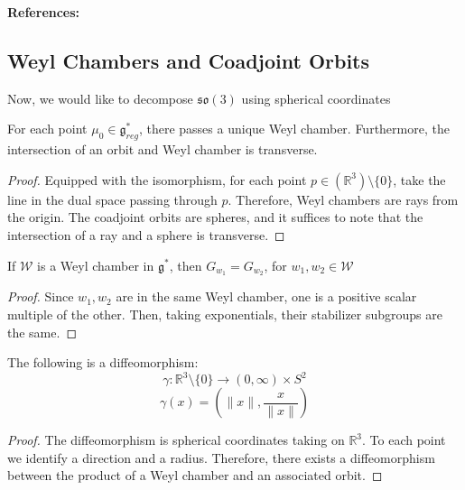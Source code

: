 \noindent \textbf{References:} \textcite{WangZuoqinLieGroups2013}

\subsection{Weyl Chambers and Coadjoint Orbits}

Now, we would like to decompose $\mathfrak{so}(3)$ using spherical coordinates 

\begin{theorem}\label{thm:weyl-chamber-unique}
For each point $\mu_{0} \in \mathfrak{g}_{reg}^{*}$, there passes a unique Weyl chamber. Furthermore, the intersection of an orbit and Weyl chamber is transverse. 
\end{theorem}

\begin{proof}
Equipped with the isomorphism, for each point $p \in (\mathbb{R}^{3}) \setminus \{0\}$, take the line in the dual space passing through $p$. Therefore, Weyl chambers are rays from the origin. The coadjoint orbits are spheres, and it suffices to note that the intersection of a ray and a sphere is transverse. 
\end{proof}

\begin{theorem}\label{thm:weyl-chamber-stabilizer}
If $\mathcal{W}$ is a Weyl chamber in $\mathfrak{g}^{*}$, then $G_{w_{1}} = G_{w_{2}}$, for $w_{1}, w_{2} \in \mathcal{W}$
\end{theorem}

\begin{proof}
Since $w_{1}, w_{2}$ are in the same Weyl chamber, one is a positive scalar multiple of the other. Then, taking exponentials, their stabilizer subgroups are the same. 
\end{proof}

\begin{theorem}\label{thm:spherical-coordinates}
The following is a diffeomorphism:
\begin{equation}
\gamma: \mathbb{R}^{3} \setminus \{0\} \to (0, \infty) \times S^{2}
\end{equation}
\begin{equation}
\gamma(x) = \left( \|x\|, \frac{x}{\|x\|} \right)
\end{equation}
\end{theorem}

\begin{proof}
The diffeomorphism is spherical coordinates taking on $\mathbb{R}^{3}$. To each point we identify a direction and a radius. Therefore, there exists a diffeomorphism between the product of a Weyl chamber and an associated orbit. 
\end{proof}

